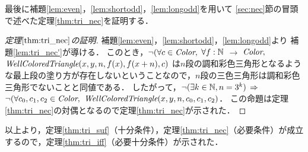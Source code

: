 最後に補題\ref{lem:even}，\ref{lem:shortodd}，\ref{lem:longodd}を用いて
\ref{sec:nec}節の冒頭で述べた定理\ref{thm:tri_nec}を証明する．
\begin{proof}[定理$\ref{thm:tri_nec}$の証明]
  補題\ref{lem:even}，\ref{lem:shortodd}，\ref{lem:longodd}より
  補題\ref{lem:tri_nec'}が導ける．
  このとき，$\lnot( \forall c \in \textit{Color},$ $\forall f:\mathbb{N}$ $\to$ $\textit{Color},$ $\textit{WellColoredTriangle}(x,y,n,f(x),f(x+n),c)$ は$n$段の調和彩色三角形となるような最上段の塗り方が存在しないということなので，$n$段の三色三角形は調和彩色三角形でないことと同値である．
  したがって，$\lnot(\exists k \in \mathbb{N}, n = 3 ^ k)$ $\Rightarrow$
  $\lnot( \forall c_0, c_1, c_2 \in \textit{Color},$ $\textit{WellColoredTriangle}(x,y,n,c_0,c_1,c_2)$．
  この命題は定理\ref{thm:tri_nec}の対偶となるので定理\ref{thm:tri_nec}が示された．
\end{proof}

以上より，定理\ref{thm:tri_suf}（十分条件），定理\ref{thm:tri_nec}（必要条件）が成立するので，定理\ref{thm:tri_iff}（必要十分条件）が示された．
